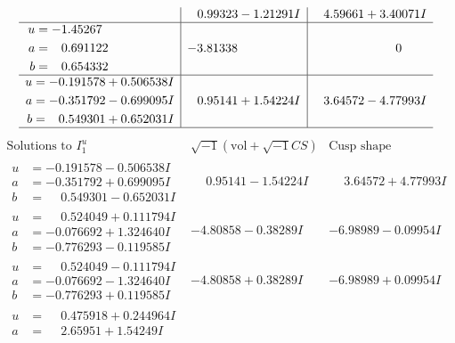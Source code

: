 \documentclass[1p]{elsarticle_modified}
\theoremstyle{definition}
\newcommand{\I}{\sqrt{-1}}
\begin{document}
$$\begin{array}{c|c|c}
 & \phantom{-}0.99323 - 1.21291 I & \phantom{-}4.59661 + 3.40071 I \\ \hline\begin{aligned}
u &= -1.45267\phantom{ +0.000000I} \\
a &= \phantom{-}0.691122\phantom{ +0.000000I} \\
b &= \phantom{-}0.654332\phantom{ +0.000000I}\end{aligned}
 & -3.81338\phantom{ +0.000000I} & \phantom{-0.000000 } 0 \\ \hline\begin{aligned}
u &= -0.191578 + 0.506538 I \\
a &= -0.351792 - 0.699095 I \\
b &= \phantom{-}0.549301 + 0.652031 I\end{aligned}
 & \phantom{-}0.95141 + 1.54224 I & \phantom{-}3.64572 - 4.77993 I\\
 \hline 
 \end{array}$$\newpage$$\begin{array}{c|c|c}  
\text{Solutions to }I^u_{1}& \I (\text{vol} + \sqrt{-1}CS) & \text{Cusp shape}\\
 \hline 
\begin{aligned}
u &= -0.191578 - 0.506538 I \\
a &= -0.351792 + 0.699095 I \\
b &= \phantom{-}0.549301 - 0.652031 I\end{aligned}
 & \phantom{-}0.95141 - 1.54224 I & \phantom{-}3.64572 + 4.77993 I \\ \hline\begin{aligned}
u &= \phantom{-}0.524049 + 0.111794 I \\
a &= -0.076692 + 1.324640 I \\
b &= -0.776293 - 0.119585 I\end{aligned}
 & -4.80858 - 0.38289 I & -6.98989 - 0.09954 I \\ \hline\begin{aligned}
u &= \phantom{-}0.524049 - 0.111794 I \\
a &= -0.076692 - 1.324640 I \\
b &= -0.776293 + 0.119585 I\end{aligned}
 & -4.80858 + 0.38289 I & -6.98989 + 0.09954 I \\ \hline\begin{aligned}
u &= \phantom{-}0.475918 + 0.244964 I \\
a &= \phantom{-}2.65951 + 1.54249 I \\

\end{aligned}
\end{array}$$
\end{document}
